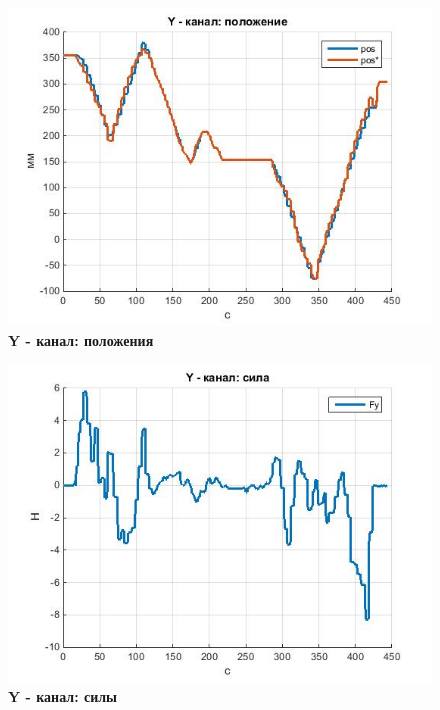 \documentclass[a4paper,14pt,russian]{extreport} \usepackage{extsizes}
\begin{document}
			\begin{figure}[h!]
				\centering		 
				\includegraphics[width=5.5in]{./graph/posY.jpg}	
				\caption{
					\textbf{Y - канал: положения}
				}
				\label{fig_img43}
			\end{figure}
			\begin{figure}[h!]
				\centering		 
				\includegraphics[width=5.5in]{./graph/powY.jpg}	
				\caption{
					\textbf{Y - канал: силы}
				}
				\label{fig_img44}
			\end{figure}
\end{document}
